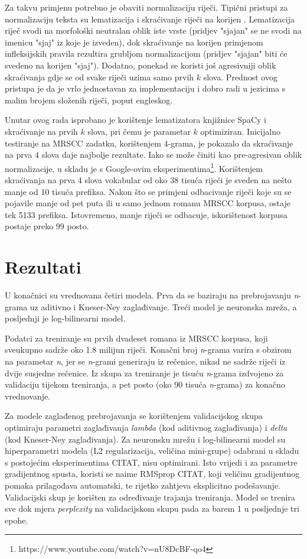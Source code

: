 \documentclass[times, utf8, diplomski, numeric]{fer}
\begin{document}
 Za takvu primjenu potrebno je obaviti normalizaciju riječi. Tipični pristupi za normalizaciju teksta su lematizacija  i skraćivanje riječi na korijen . Lematizacija riječ svodi na morfološki neutralan oblik iste vrste (pridjev "sjajan" se ne svodi na imenicu "sjaj" iz koje je izveden), dok skraćivanje na korijen primjenom infleksijskih pravila rezultira grubljom normalizacijom (pridjev "sjajan" biti će svedeno na korijen "sjaj"). Dodatno, ponekad se koristi još agresivniji oblik skraćivanja gdje se od svake riječi uzima samo prvih $k$ slova. Prednost ovog pristupa je da je vrlo jednostavan za implementaciju i dobro radi u jezicima s malim brojem složenih riječi, poput engleskog.

 Unutar ovog rada isprobano je korištenje lematizatora knjižnice SpaCy i skraćivanje na prvih $k$ slova, pri čemu je parametar $k$ optimiziran. Inicijalno testiranje na MRSCC zadatku, korištenjem 4-grama, je pokazalo da skraćivanje na prva $4$ slova daje najbolje rezultate. Iako se može činiti kao pre-agresivan oblik normalizacije, u skladu je s Google-ovim eksperimentima\footnote{https://www.youtube.com/watch?v=nU8DcBF-qo4}. Korištenjem skraćivanja na prva 4 slova vokabular od oko 38 tisuća riječi je sveden na nešto manje od 10 tisuća prefiksa. Nakon što se primjeni odbacivanje riječi koje su se pojavile manje od pet puta ili u samo jednom romanu MRSCC korpusa, ostaje tek 5133 prefiksa. Istovremeno, manje riječi se odbacuje, iskorištenost korpusa postaje preko 99 posto. 


\section{Rezultati}

U konačnici su vrednovana četiri modela. Prva da se baziraju na prebrojavanju \textit{n}-grama uz aditivno i Kneser-Ney zaglađivanje. Treći model je neuronska mreža, a posljednji je log-bilinearni model.

Podatci za treniranje su prvih dvadeset romana iz MRSCC korpusa, koji sveukupno sadrže oko 1.8 milijun riječi. Konačni broj \textit{n}-grama varira s obzirom na parametar \textit{n}, jer se \textit{n}-grami generiraju iz rečenice, nikad ne sadrže riječi iz dvije susjedne rečenice. Iz skupa za treniranje je tisuću \textit{n}-grama izdvojeno za validaciju tijekom treniranja, a pet posto (oko 90 tisuća \textit{n}-grama) za konačno vrednovanje.

Za modele zaglađenog prebrojavanja se korištenjem validacijskog skupa optimiraju parametri zaglađivanja \textit{lambda} (kod aditivnog zaglađivanja) i \textit{delta} (kod Kneser-Ney zaglađivanja). Za neuronsku mrežu i log-bilinearni model su hiperparametri modela (L2 regularizacija, veličina mini-grupe) odabrani u skladu s postojećim eksperimentima CITAT, nisu optimirani. Isto vrijedi i za parametre gradijentnog spusta, koristi se naime RMSprop CITAT, koji veličinu gradijentnog pomaka prilagođava automatski, te rijetko zahtjeva eksplicitno podešavanje. Validacijski skup je korišten za određivanje trajanja treniranja. Model se trenira sve dok mjera \textit{perplexity} na validacijskom skupu pada za barem 1 u posljednje tri epohe.
\end{document}
